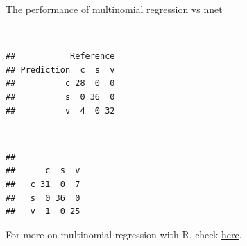 \documentclass[10pt,ignorenonframetext,]{beamer}
\newenvironment{Shaded}{\begin{snugshade}}{\end{snugshade}}
\newcommand{\DataTypeTok}[1]{\textcolor[rgb]{0.13,0.29,0.53}{#1}}
\newcommand{\KeywordTok}[1]{\textcolor[rgb]{0.13,0.29,0.53}{\textbf{#1}}}
\newcommand{\NormalTok}[1]{#1}
\newcommand{\OperatorTok}[1]{\textcolor[rgb]{0.81,0.36,0.00}{\textbf{#1}}}
\newcommand{\StringTok}[1]{\textcolor[rgb]{0.31,0.60,0.02}{#1}}
\begin{document}
\begin{frame}[fragile]

\begin{block}{The performance of multinomial regression vs nnet}

\(~\)

\scriptsize

\begin{Shaded}
\end{Shaded}

\begin{verbatim}
##           Reference
## Prediction  c  s  v
##          c 28  0  0
##          s  0 36  0
##          v  4  0 32
\end{verbatim}

\(~\)

\begin{Shaded}
\end{Shaded}

\begin{verbatim}
##    
##      c  s  v
##   c 31  0  7
##   s  0 36  0
##   v  1  0 25
\end{verbatim}

\end{block}

\end{frame}

\begin{frame}

For more on multinomial regression with R, check
\href{https://www.r-bloggers.com/\%F0\%9F\%93\%8A-multinomial-regression-in-r/}{here}.

\end{frame}
\end{document}
